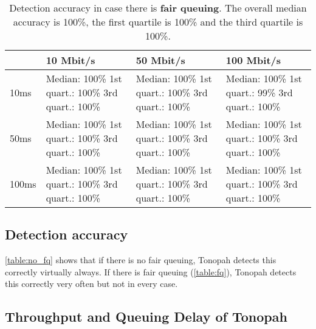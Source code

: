 \documentclass[conference]{IEEEtran}
\begin{document}
\begin{table}
\begin{tabularx}{\columnwidth}{| l | X | X | X |}
\hline
& 10 Mbit/s & 50 Mbit/s & 100 Mbit/s \\ \hline
10ms & Median: 100\% \newline 1st quart.: 100\% \newline 3rd quart.: 100\% & Median: 100\% \newline 1st quart.: 100\% \newline 3rd quart.: 100\% & Median: 100\% \newline 1st quart.: 99\% \newline 3rd quart.: 100\%\\ \hline
50ms & Median: 100\% \newline 1st quart.: 100\% \newline 3rd quart.: 100\% & Median: 100\% \newline 1st quart.: 100\% \newline 3rd quart.: 100\% & Median: 100\% \newline 1st quart.: 100\% \newline 3rd quart.: 100\% \\ \hline
100ms & Median: 100\% \newline 1st quart.: 100\% \newline 3rd quart.: 100\% & Median: 100\% \newline 1st quart.: 100\% \newline 3rd quart.: 100\% & Median: 100\% \newline 1st quart.: 100\% \newline 3rd quart.: 100\% \\ \hline
\end{tabularx}
\caption{Detection accuracy in case there is \textbf{fair queuing}.  The overall median accuracy is 100\%, the first quartile is 100\% and the third quartile is 100\%.}
\label{table:fq}
\end{table}    

\subsection{Detection accuracy}

\autoref{table:no_fq} shows that if there is no fair queuing, Tonopah detects this correctly virtually always. 
If there is fair queuing (\autoref{table:fq}), Tonopah detects this correctly very often but not in every case. 

\subsection{Throughput and Queuing Delay of Tonopah}
\end{document}
